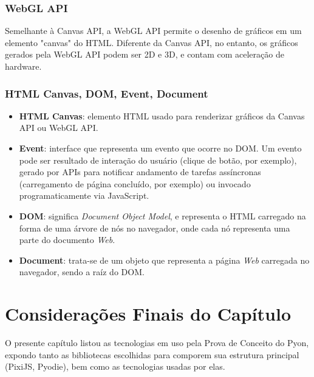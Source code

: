 \subsubsection{WebGL API}

Semelhante à Canvas API, a WebGL API permite o desenho de gráficos em um elemento "canvas" do HTML.
Diferente da Canvas API, no entanto, os gráficos gerados pela WebGL API podem ser 2D e 3D, e contam
com aceleração de hardware.

\subsubsection{HTML Canvas, DOM, Event, Document}

\begin{itemize}

	\item \textbf{HTML Canvas}: elemento HTML usado para renderizar gráficos da Canvas API ou WebGL API.
	\item  \textbf{Event}: interface que representa um evento que ocorre no DOM. Um evento pode ser resultado
	de interação do usuário (clique de botão, por exemplo), gerado por APIs para notificar andamento
	de tarefas assíncronas (carregamento de página concluído, por exemplo) ou invocado programaticamente
	via JavaScript.
	\item  \textbf{DOM}: significa \textit{Document Object Model}, e representa o HTML carregado na
	forma de uma árvore de nós no navegador, onde cada nó representa uma parte do documento \textit{Web}.
	\item \textbf{Document}: trata-se de um objeto que representa a página \textit{Web} carregada no
	navegador, sendo a raíz do DOM.

\end{itemize}

\section{Considerações Finais do Capítulo}

O presente capítulo listou as tecnologias em uso pela Prova de Conceito do Pyon, expondo tanto as bibliotecas
escolhidas para comporem sua estrutura principal (PixiJS, Pyodie), bem como as tecnologias usadas por elas.
